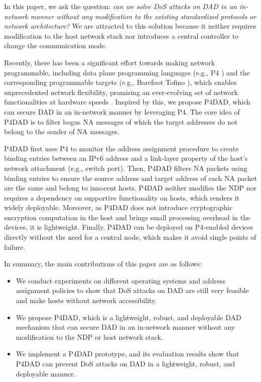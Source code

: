 \documentclass[a4paper,fleqn]{cas-dc}
\begin{document}
    In this paper, we ask the question: \emph{can we solve DoS attacks on DAD in an in-network manner without any modification to the existing standardized protocols or network architecture?} We are attracted to this solution because it neither requires modification to the host network stack nor introduces a central controller to change the communication mode.
    
    Recently, there has been a significant effort towards making network programmable, including data plane programming languages (e.g., P4 \cite{P4}) and the corresponding programmable targets (e.g., Barefoot Tofino \cite{tofino}), which enables unprecedented network flexibility, promising an ever-evolving set of network functionalities at hardware speeds \cite{yu2020netlock,zhang2020gallium,kim2020tea}.
    Inspired by this, we propose P4DAD, which can secure DAD in an in-network manner by leveraging P4.
    The core idea of P4DAD is to filter bogus NA messages of which the target addresses do not belong to the sender of NA messages. 
    
    P4DAD first uses P4 to monitor the address assignment procedure to create binding entries between an IPv6 address and a link-layer property of the host's network attachment (e.g., switch port). Then, P4DAD filters NA packets using binding entries to ensure the source address and target address of each NA packet are the same and belong to innocent hosts. P4DAD neither modifies the NDP nor requires a dependency on supportive functionality on hosts, which renders it widely deployable. 
    Moreover, as P4DAD does not introduce cryptographic encryption computation in the host and brings small processing overhead in the devices, it is lightweight. 
    Finally, P4DAD can be deployed on P4-enabled devices directly without the need for a central node, which makes it avoid single points of failure.

    In summary, the main contributions of this paper are as follows: 
    \begin{itemize}
        \item We conduct experiments on different operating systems and address assignment policies to show that DoS attacks on DAD are still very feasible and make hosts without network accessibility.

        \item We propose P4DAD, which is a lightweight, robust, and deployable DAD mechanism that can secure DAD in an in-network manner without any modification to the NDP or host network stack.


        \item We implement a P4DAD prototype, and its evaluation results show that P4DAD can prevent DoS attacks on DAD in a lightweight, robust, and deployable manner.
    \end{itemize}
   
\end{document}
